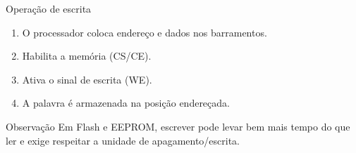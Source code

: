 \begin{frame}[t]{Operação de escrita}
  \begin{enumerate}
    \item O processador coloca endereço e dados nos barramentos.
    \item Habilita a memória (CS/CE).
    \item Ativa o sinal de escrita (WE).
    \item A palavra é armazenada na posição endereçada.
  \end{enumerate}
  \begin{alertblock}{Observação}
    Em Flash e EEPROM, escrever pode levar bem mais tempo do que ler e exige respeitar a unidade de apagamento/escrita.
  \end{alertblock}
\end{frame}
